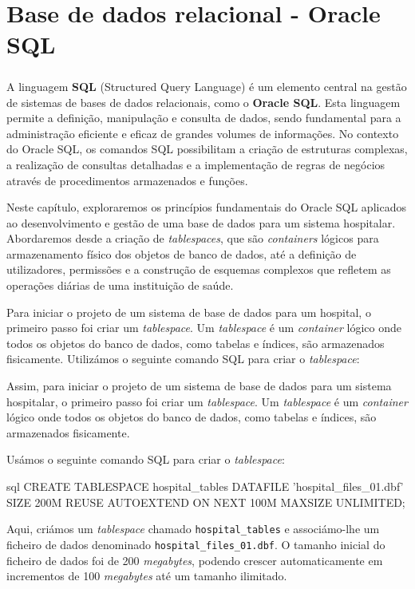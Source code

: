 \chapter{Base de dados relacional - Oracle SQL}
\paragraph{}
A linguagem \textbf{SQL} (Structured Query Language) é um elemento central na gestão de sistemas de bases de dados relacionais, como o \textbf{Oracle SQL}. Esta linguagem permite a definição, manipulação e consulta de dados, sendo fundamental para a administração eficiente e eficaz de grandes volumes de informações. No contexto do Oracle SQL, os comandos SQL possibilitam a criação de estruturas complexas, a realização de consultas detalhadas e a implementação de regras de negócios através de procedimentos armazenados e funções.

Neste capítulo, exploraremos os princípios fundamentais do Oracle SQL aplicados ao desenvolvimento e gestão de uma base de dados para um sistema hospitalar. Abordaremos desde a criação de \textit{tablespaces}, que são \textit{containers} lógicos para armazenamento físico dos objetos de banco de dados, até a definição de utilizadores, permissões e a construção de esquemas complexos que refletem as operações diárias de uma instituição de saúde.

Para iniciar o projeto de um sistema de base de dados para um hospital, o primeiro passo foi criar um \textit{tablespace}. Um \textit{tablespace} é um \textit{container} lógico onde todos os objetos do banco de dados, como tabelas e índices, são armazenados fisicamente. Utilizámos o seguinte comando SQL para criar o \textit{tablespace}:

Assim, para iniciar o projeto de um sistema de base de dados para um sistema hospitalar, o primeiro passo foi criar um \textit{tablespace}. Um \textit{tablespace} é um \textit{container} lógico onde todos os objetos do banco de dados, como tabelas e índices, são armazenados fisicamente.

Usámos o seguinte comando SQL para criar o \textit{tablespace}:

\begin{myminted}{sql}
CREATE TABLESPACE hospital_tables
DATAFILE 'hospital_files_01.dbf'
SIZE 200M REUSE AUTOEXTEND ON
NEXT 100M MAXSIZE UNLIMITED;
\end{myminted}


Aqui, criámos um \textit{tablespace} chamado \texttt{hospital\_tables} e associámo-lhe um ficheiro de dados denominado \texttt{hospital\_files\_01.dbf}. O tamanho inicial do ficheiro de dados foi de 200 \textit{megabytes}, podendo crescer automaticamente em incrementos de 100 \textit{megabytes} até um tamanho ilimitado.

